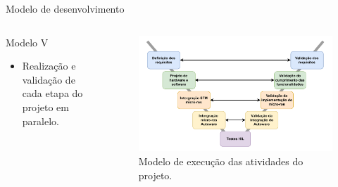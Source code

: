 \documentclass{if-beamer}
\begin{document}
\begin{frame}{Modelo de desenvolvimento}
	
	\begin{columns}
		
		\begin{column}{0.4\textwidth}
			
				\begin{block}{Modelo V}
				
				\begin{itemize}
					\item Realização e validação de cada etapa do projeto em paralelo.
					
				\end{itemize}
				
			\end{block}
			
		\end{column}
		
		\begin{column}{0.7\textwidth}
			
				
			\begin{figure}
				\centering
				\includegraphics[width=\linewidth]{img/modelo-v}
				\caption{Modelo de execução das atividades do projeto.}
				\label{fig:modelo-v}
			\end{figure}
			
		\end{column}
		
	\end{columns}
	
\end{frame}
\end{document}

